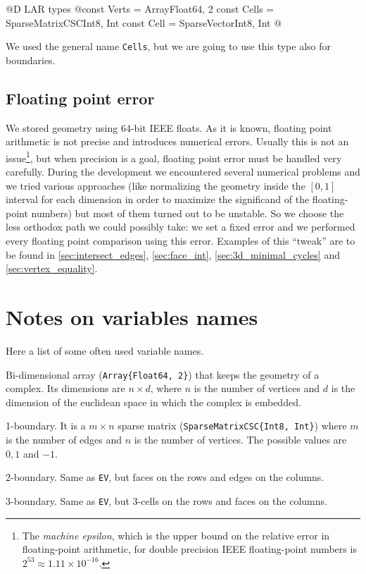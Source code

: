 @D LAR types
@{const Verts = Array{Float64, 2}
const Cells = SparseMatrixCSC{Int8, Int}
const Cell = SparseVector{Int8, Int}
@}

We used the general name \texttt{Cells}, but
we are going to use this type also for boundaries.

\subsection{Floating point error}
\label{sec:floating-point_error}

We stored geometry using 64-bit IEEE floats.
As it is known, floating point arithmetic is not
precise and introduces numerical errors.
Usually this is not an issue\footnote{The \textit{machine epsilon},
which is the upper bound on the relative error in floating-point 
arithmetic, for double precision IEEE floating-point numbers is 
$2^53 \approx 1.11 \times 10^{-16}$.}, but when precision is
a goal, floating point error must be handled very carefully.
During the development we encountered several numerical problems
and we tried various approaches (like normalizing the geometry
inside the $[0, 1]$ interval for each dimension in order to maximize
the significand of the floating-point numbers) but most of them turned 
out to be unstable. So we choose the less orthodox path we could
possibly take: we set a fixed error and we performed every floating point
comparison using this error. Examples of this ``tweak'' are to be found in
\ref{sec:intersect_edges}, \ref{sec:face_int}, \ref{sec:3d_minimal_cycles} and 
\ref{sec:vertex_equality}.

\section{Notes on variables names}

Here a list of some often used variable names.

\begin{description}[align=right,labelwidth=2em]
    \item [\texttt{V}:]
        Bi-dimensional array (\texttt{Array\{Float64, 2\}}) that keeps the geometry of a complex.
        Its dimensions are $n \times d$, where $n$ is the number of vertices and $d$ is the dimension
        of the euclidean space in which the complex is embedded.
    \item [\texttt{EV}:]
        1-boundary. It is a $m \times n$ sparse matrix (\texttt{SparseMatrixCSC\{Int8, Int\}}) 
        where $m$ is the number of edges and $n$ is the number of vertices. The possible values
        are $0, 1$ and $-1$.
    \item [\texttt{FE}:]
        2-boundary. Same as \texttt{EV}, but faces on the rows and edges on the columns.
    \item [\texttt{CF}:]
        3-boundary. Same as \texttt{EV}, but 3-cells on the rows and faces on the columns.
    

\end{description}